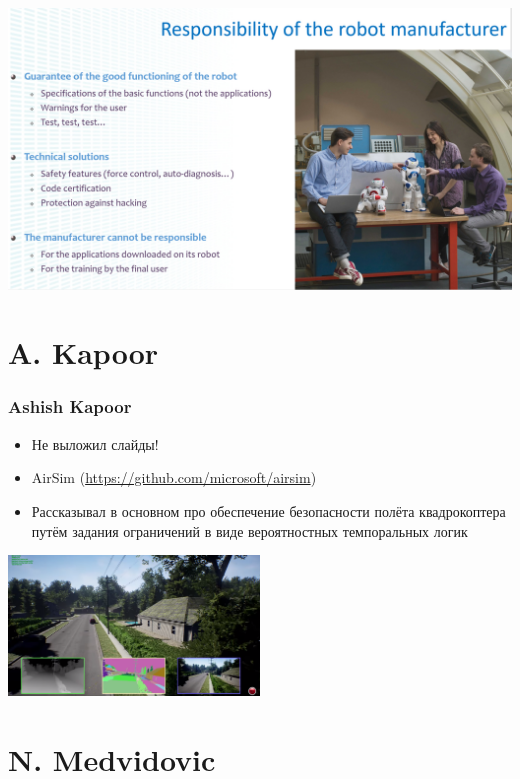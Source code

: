 \documentclass[xetex,mathserif,serif]{beamer}
\begin{document}
	\begin{frame}
		\begin{center}
			\includegraphics[width=\textwidth]{gelin21.png}
		\end{center}
	\end{frame}

	\section{A. Kapoor}

	\begin{frame}
		\frametitle{Ashish Kapoor}
		\begin{itemize}
			\item Не выложил слайды!
			\item AirSim (\url{https://github.com/microsoft/airsim})
			\item Рассказывал в основном про обеспечение безопасности полёта квадрокоптера путём задания ограничений в виде вероятностных темпоральных логик
		\end{itemize}
		\begin{center}
			\includegraphics[width=0.5\textwidth]{airSim.png}
		\end{center}
	\end{frame}

	\section{N. Medvidovic}
	
\end{document}
